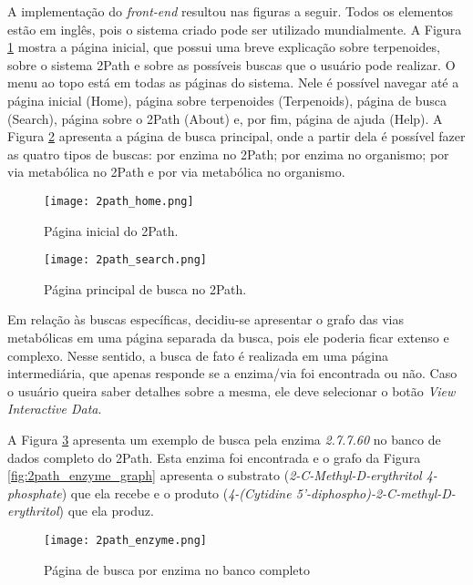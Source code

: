 \indent A implementação do \textit{front-end} resultou nas figuras a seguir. Todos os elementos estão em inglês, pois o sistema criado pode ser utilizado mundialmente. A Figura \ref{fig:2path_home} mostra a página inicial, que possui uma breve explicação sobre terpenoides, sobre o sistema 2Path e sobre as possíveis buscas que o usuário pode realizar. O menu ao topo está em todas as páginas do sistema. Nele é possível navegar até a página inicial (Home), página sobre terpenoides (Terpenoids), página de busca (Search), página sobre o 2Path (About) e, por fim, página de ajuda (Help). A Figura \ref{fig:2path_search} apresenta a página de busca principal, onde a partir dela é possível fazer as quatro tipos de buscas: por enzima no 2Path; por enzima no organismo; por via metabólica no 2Path e por via metabólica no organismo.

\begin{figure}[!h]
    \centering
    \texttt{[image: 2path\_home.png]}
    \caption{Página inicial do 2Path.}
    \label{fig:2path_home}
\end{figure}

\begin{figure}[!h]
    \centering
    \texttt{[image: 2path\_search.png]}
    \caption{Página principal de busca no 2Path.}
    \label{fig:2path_search}
\end{figure}

\indent Em relação às buscas específicas, decidiu-se apresentar o grafo das vias metabólicas em uma página separada da busca, pois ele poderia ficar extenso e complexo. Nesse sentido, a busca de fato é realizada em uma página intermediária, que apenas responde se a enzima/via foi encontrada ou não. Caso o usuário queira saber detalhes sobre a mesma, ele deve selecionar o botão \textit{View Interactive Data}.

\indent A Figura \ref{fig:2path_enzyme} apresenta um exemplo de busca pela enzima \textit{2.7.7.60} no banco de dados completo do 2Path. Esta enzima foi encontrada e o grafo da Figura \ref{fig:2path_enzyme_graph} apresenta o substrato (\textit{2-C-Methyl-D-erythritol 4-phosphate}) que ela recebe e o produto (\textit{4-(Cytidine 5'-diphospho)-2-C-methyl-D-erythritol}) que ela produz. 

\begin{figure}[!h]
    \centering
    \texttt{[image: 2path\_enzyme.png]}
    \caption{Página de busca por enzima no banco completo}
    \label{fig:2path_enzyme}
\end{figure}

